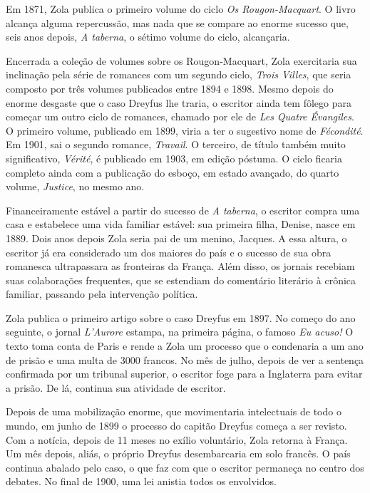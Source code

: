 Em 1871, Zola publica o primeiro volume do ciclo \textit{Os Rougon-Macquart}.
O livro alcança alguma repercussão, mas nada que se compare ao enorme
sucesso que, seis anos depois, \textit{A taberna}, o sétimo volume do
ciclo, alcançaria. 

Encerrada a coleção de volumes sobre os Rougon-Macquart, Zola
exercitaria sua inclinação pela série de romances com um segundo ciclo,
\textit{Trois Villes}, que seria composto por três volumes publicados entre
1894 e 1898. Mesmo depois do enorme desgaste que o caso Dreyfus lhe
traria, o escritor ainda tem fôlego para começar um outro ciclo de
romances, chamado por ele de \textit{Les Quatre Évangiles}. O primeiro volume,
publicado em 1899, viria a ter o sugestivo nome de \textit{Fécondité}.
Em 1901, sai o segundo romance, \textit{Travail}. O terceiro, de título
também muito significativo, \textit{Vérité}, é publicado em 1903, em
edição póstuma. O ciclo ficaria completo ainda com a publicação do
esboço, em estado avançado, do quarto volume, \textit{Justice}, no
mesmo ano.

 Financeiramente estável a partir do sucesso de \textit{A taberna}, o
escritor compra uma casa e estabelece uma vida familiar estável: sua
primeira filha, Denise, nasce em 1889. Dois anos depois Zola seria pai
de um menino, Jacques. A essa altura, o escritor já era considerado um
dos maiores do país e o sucesso de sua obra romanesca ultrapassara as
fronteiras da França. Além disso, os jornais recebiam suas colaborações
frequentes, que se estendiam do comentário literário à crônica
familiar, passando pela intervenção política. 

Zola publica o primeiro artigo sobre o caso Dreyfus em 1897. No começo
do ano seguinte, o jornal \textit{L'Aurore} estampa, na primeira página,
o famoso \textit{Eu acuso!} O texto toma conta de Paris e rende a Zola um
processo que o condenaria a um ano de prisão e uma multa de 3000
francos. No mês de julho, depois de ver a sentença confirmada por um
tribunal superior, o escritor foge para a Inglaterra para evitar a
prisão. De lá, continua sua atividade de escritor.

Depois de uma mobilização enorme, que movimentaria intelectuais de todo
o mundo, em junho de 1899 o processo do capitão Dreyfus começa a ser
revisto. Com a notícia, depois de 11 meses no exílio voluntário, Zola
retorna à França. Um mês depois, aliás, o próprio Dreyfus desembarcaria
em solo francês. O país continua abalado pelo caso, o que faz com que
o escritor permaneça no centro dos debates. No final de 1900, uma lei
anistia todos os envolvidos.


